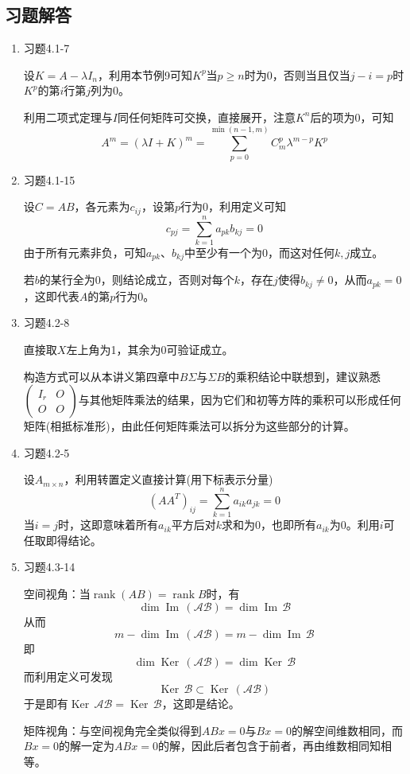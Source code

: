 \documentclass[a4paper,UTF8,fontset=windows]{ctexart}
\DeclareMathOperator{\rank}{rank}
\DeclareMathOperator{\im}{Im\,}
\DeclareMathOperator{\Ker}{Ker\,}
\newcommand*{\ma}{\mathcal{A}}
\newcommand*{\mb}{\mathcal{B}}
\newcommand*{\note}{\noindent *}
\begin{document}
\subsection{习题解答}
\begin{enumerate}
    \item 习题4.1-7
    
    设$K=A-\lambda I_n$，利用本节例9可知$K^p$当$p\ge n$时为0，否则当且仅当$j-i=p$时$K^p$的第$i$行第$j$列为0。

    利用二项式定理与$I$同任何矩阵可交换，直接展开，注意$K^n$后的项为0，可知
    $$A^m=(\lambda I+K)^m=\sum_{p=0}^{\min(n-1,m)}C_m^p\lambda^{m-p}K^p$$

    \item 习题4.1-15
    
    设$C=AB$，各元素为$c_{ij}$，设第$p$行为0，利用定义可知
    $$c_{pj}=\sum_{k=1}^na_{pk}b_{kj}=0$$
    由于所有元素非负，可知$a_{pk}$、$b_{kj}$中至少有一个为0，而这对任何$k,j$成立。

    若$b$的某行全为0，则结论成立，否则对每个$k$，存在$j$使得$b_{kj}\ne0$，从而$a_{pk}=0$，这即代表$A$的第$p$行为0。

    \item 习题4.2-8
    
    直接取$X$左上角为1，其余为0可验证成立。

    \note 构造方式可以从本讲义第四章中$B\Sigma$与$\Sigma B$的乘积结论中联想到，建议熟悉$\begin{pmatrix}I_r&O\\O&O\end{pmatrix}$与其他矩阵乘法的结果，因为它们和初等方阵的乘积可以形成任何矩阵(相抵标准形)，由此任何矩阵乘法可以拆分为这些部分的计算。

    \item 习题4.2-5
    
    设$A_{m\times n}$，利用转置定义直接计算(用下标表示分量)
    $$(AA^T)_{ij}=\sum_{k=1}^na_{ik}a_{jk}=0$$
    当$i=j$时，这即意味着所有$a_{ik}$平方后对$k$求和为0，也即所有$a_{ik}$为0。利用$i$可任取即得结论。


    \item 习题4.3-14
    
    空间视角：当$\rank(AB)=\rank B$时，有
    $$\dim\im(\ma\mb)=\dim\im\mb$$
    从而
    $$m-\dim\im(\ma\mb)=m-\dim\im\mb$$
    即
    $$\dim\Ker(\ma\mb)=\dim\Ker\mb$$
    而利用定义可发现
    $$\Ker\mb\subset\Ker(\ma\mb)$$
    于是即有$\Ker\ma\mb=\Ker\mb$，这即是结论。

    矩阵视角：与空间视角完全类似得到$ABx=0$与$Bx=0$的解空间维数相同，而$Bx=0$的解一定为$ABx=0$的解，因此后者包含于前者，再由维数相同知相等。


\end{enumerate}
\end{document}
